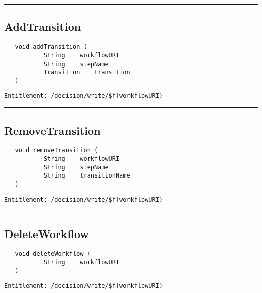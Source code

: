 \rule{12cm}{2pt}
\subsection{AddTransition}
\label{Api:AddTransition}
\begin{verbatim}
   void addTransition (
           String    workflowURI
           String    stepName
           Transition    transition
   )
\end{verbatim}
\begin{Verbatim}[fontsize=\small, formatcom=\color{Maroon}]
  Entitlement: /decision/write/$f(workflowURI)
\end{Verbatim}



\rule{12cm}{2pt}
\subsection{RemoveTransition}
\label{Api:RemoveTransition}
\begin{verbatim}
   void removeTransition (
           String    workflowURI
           String    stepName
           String    transitionName
   )
\end{verbatim}
\begin{Verbatim}[fontsize=\small, formatcom=\color{Maroon}]
  Entitlement: /decision/write/$f(workflowURI)
\end{Verbatim}



\rule{12cm}{2pt}
\subsection{DeleteWorkflow}
\label{Api:DeleteWorkflow}
\begin{verbatim}
   void deleteWorkflow (
           String    workflowURI
   )
\end{verbatim}
\begin{Verbatim}[fontsize=\small, formatcom=\color{Maroon}]
  Entitlement: /decision/write/$f(workflowURI)
\end{Verbatim}



